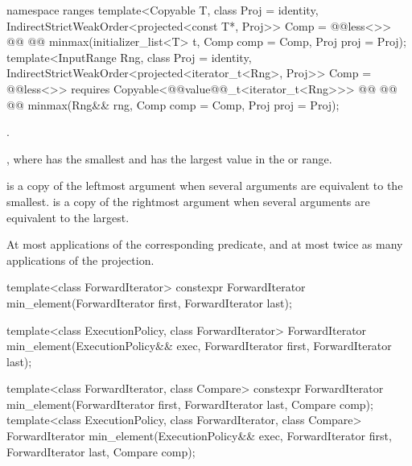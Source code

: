 \begin{addedblock}
%
\begin{itemdecl}
namespace ranges {
  template<Copyable T, class Proj = identity,
      IndirectStrictWeakOrder<projected<const T*, Proj>> Comp = @@less<>>
    @@
    @@
      minmax(initializer_list<T> t, Comp comp = Comp{}, Proj proj = Proj{});
  template<InputRange Rng, class Proj = identity,
      IndirectStrictWeakOrder<projected<iterator_t<Rng>, Proj>> Comp = @@less<>>
    requires Copyable<@@value@@_t<iterator_t<Rng>>>
    @@
                @@
    @@
      minmax(Rng&& rng, Comp comp = Comp{}, Proj proj = Proj{});
}
\end{itemdecl}

\begin{itemdescr}
\pnum
\requires {}.

\pnum
\returns {}, where  has the smallest and  has the
largest value in the  or range.

\pnum
\remarks {} is a copy of the leftmost argument when several arguments are equivalent to
the smallest.  is a copy of the rightmost argument when several arguments are
equivalent to the largest.

\pnum
\complexity At most 
applications of the corresponding predicate, and at most twice as many applications of the projection.
\end{itemdescr}
\end{addedblock}

%
\begin{itemdecl}
template<class ForwardIterator>
  constexpr ForwardIterator min_element(ForwardIterator first, ForwardIterator last);

template<class ExecutionPolicy, class ForwardIterator>
  ForwardIterator min_element(ExecutionPolicy&& exec,
                              ForwardIterator first, ForwardIterator last);

template<class ForwardIterator, class Compare>
  constexpr ForwardIterator min_element(ForwardIterator first, ForwardIterator last,
                                        Compare comp);
template<class ExecutionPolicy, class ForwardIterator, class Compare>
  ForwardIterator min_element(ExecutionPolicy&& exec,
                              ForwardIterator first, ForwardIterator last,
                              Compare comp);
\end{itemdecl}

